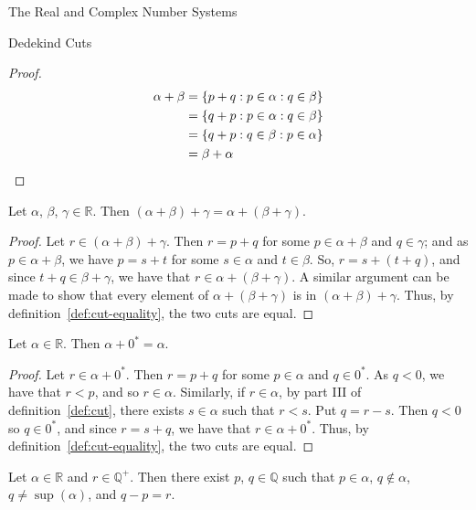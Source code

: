 \begin{chapter}{The Real and Complex Number Systems}
\begin{section}{Dedekind Cuts}
	\begin{proof}
		\begin{align*}
			\alpha + \beta
			&= \{p + q : p \in \alpha : q \in \beta\} \\
			&= \{q + p : p \in \alpha : q \in \beta\} \\
			&= \{q + p : q \in \beta : p \in \alpha\} \\
			&= \beta + \alpha \qedhere
		\end{align*}
	\end{proof}

	\begin{theorem}
		\label{thm:cut-addition-associativity}
		Let $\alpha$, $\beta$, $\gamma \in \mathbb{R}$. Then $(\alpha + \beta) + 
		\gamma = \alpha + (\beta + \gamma)$.
	\end{theorem}

	\begin{proof}
		Let $r \in (\alpha + \beta) + \gamma$. Then $r = p + q$ for some $p
		\in \alpha + \beta$ and $q \in \gamma$; and as $p \in \alpha + \beta$,
		we have $p = s + t$ for some $s \in \alpha$ and $t \in \beta$. So,
		$r = s + (t + q)$, and since $t + q \in \beta + \gamma$, we have that
		$r \in \alpha + (\beta + \gamma)$. A similar argument can be made to show
		that every element of $\alpha + (\beta + \gamma)$ is in $(\alpha +
		\beta) + \gamma$. Thus, by definition~\ref{def:cut-equality}, the two cuts
		are equal.
	\end{proof}

	\begin{theorem}
		\label{thm:cut-additive-identity}
		Let $\alpha \in \mathbb{R}$. Then $\alpha + 0^* = \alpha$.
	\end{theorem}

	\begin{proof}
		Let $r \in \alpha + 0^*$. Then $r = p + q$ for some $p \in \alpha$
		and $q \in 0^*$. As $q < 0$, we have that $r < p$, and so $r \in
		\alpha$. Similarly, if $r \in \alpha$, by part III of
		definition~\ref{def:cut}, there exists $s \in \alpha$ such that $r <
		s$. Put $q = r - s$. Then $q < 0$ so $q \in 0^*$, and since $r = s
		+ q$, we have that $r \in \alpha + 0^*$. Thus, by
		definition~\ref{def:cut-equality}, the two cuts are equal.
	\end{proof}

	\begin{theorem}
		\label{thm:exists-cut-rational-difference}
		Let $\alpha \in \mathbb{R}$ and $r \in \mathbb{Q}^+$. Then there exist 
		$p$, $q \in \mathbb{Q}$ such that $p \in \alpha$, $q \nin \alpha$, $q
		\neq \sup(\alpha)$, and $q - p = r$.
	\end{theorem}


\end{section}
\end{chapter}
